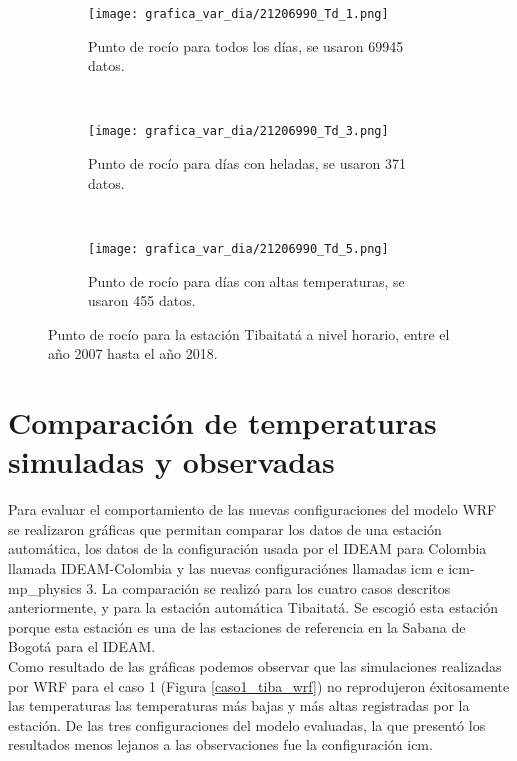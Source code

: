 \begin{figure}[H]
    \centering
    \begin{subfigure}[b]{0.45\textwidth}
    \caption{Punto de rocío para todos los días, se usaron 69945 datos.}
	\texttt{[image: grafica\_var\_dia/21206990\_Td\_1.png]}
    \label{subfig:td_total}
	\end{subfigure}
	~
    \begin{subfigure}[b]{0.45\textwidth}
    \caption{Punto de rocío para días con heladas, se usaron 371 datos.}
	\texttt{[image: grafica\_var\_dia/21206990\_Td\_3.png]}
    \label{subfig:td_min}
	\end{subfigure}
		~
    \begin{subfigure}[b]{0.45\textwidth}
    \caption{Punto de rocío para días con altas temperaturas, se usaron 455 datos.}
	\texttt{[image: grafica\_var\_dia/21206990\_Td\_5.png]}
    \label{subfig:td_max}
	\end{subfigure}
	
    \caption{Punto de rocío para la estación Tibaitatá a nivel horario, entre el año 2007 hasta el año 2018.}
\end{figure}


\section{Comparación de temperaturas simuladas y observadas}

Para evaluar el comportamiento de las nuevas configuraciones del modelo WRF se realizaron gráficas que permitan comparar los datos de una estación automática, los datos de la configuración usada por el IDEAM para Colombia llamada IDEAM-Colombia y las nuevas configuraciónes llamadas icm e icm-mp\_physics 3. La comparación se realizó para los cuatro casos descritos anteriormente, y para la estación automática Tibaitatá. Se escogió esta estación porque esta estación es una de las estaciones de referencia en la Sabana de Bogotá para el IDEAM.\\

Como resultado de las gráficas podemos observar que las simulaciones realizadas por WRF para el caso 1 (Figura \ref{caso1_tiba_wrf}) no reprodujeron éxitosamente las temperaturas las temperaturas más bajas y más altas registradas por la estación. De las tres configuraciones del modelo evaluadas, la que presentó los resultados menos lejanos a las observaciones fue la configuración icm.\\

